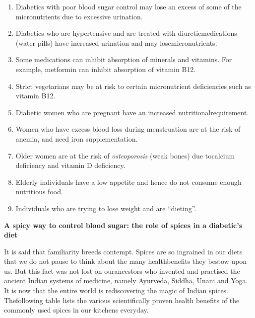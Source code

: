 \begin{enumerate}[•]
\itemsep=0pt
\item Diabetics with poor blood sugar control may lose an excess of some of the micronutrients due to excessive urination.
\item Diabetics who are hypertensive and are treated with diuretic\break medications (water pills) have increased urination and may lose\break micronutrients.
\item Some medications can inhibit absorption of minerals and vitamins. For example, metformin can inhibit absorption of vitamin B12.
\item Strict vegetarians may be at risk to certain micronutrient defici\-encies such as vitamin B12.
\item Diabetic women who are pregnant have an increased nutritional\break requirement.
\item Women who have excess blood loss during menstruation are at the risk of anemia, and need iron supplementation.
\item Older women are at the risk of \textit{osteoporosis} (weak bones) due to\break calcium deficiency and vitamin D deficiency.
\item Elderly individuals have a low appetite and hence do not consume enough nutritious food.
\item Individuals who are trying to lose weight and are “dieting”.
\end{enumerate}

\noindent\textbf{A spicy way to control blood sugar: the role of spices in a diabetic’s diet}

It is said that familiarity breeds contempt. Spices are so ingrained in our diets that we do not pause to think about the many health\break benefits they bestow upon us. But this fact was not lost on our\break ancestors who invented and practised the ancient Indian systems of medicine, namely Ayurveda, Siddha, Unani and Yoga. It is now that the entire world is rediscovering the magic of Indian spices. The\break following table lists the various scientifically proven health benefits of the commonly used spices in our kitchens everyday.

